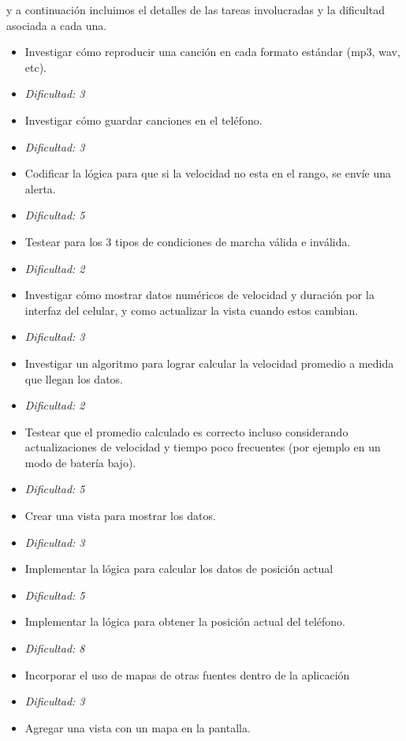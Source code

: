 \documentclass[10pt, a4paper,english,spanish]{article}
\begin{document}
y a continuaci\'on incluimos el detalles de las tareas involucradas y la dificultad asociada a cada una.

\begin{itemize}
	\itemsep 0em
	\item Investigar cómo reproducir una canción en cada formato estándar (mp3,
	wav, etc).
	\item[] \hfill \textit{Dificultad: 3}
	\item Investigar cómo guardar canciones en el teléfono.
	\item[] \hfill \textit{Dificultad: 3}
	\item Codificar la lógica para que si la velocidad no esta en el rango, se
	envíe una alerta.
	\item[] \hfill \textit{Dificultad: 5}
	\item Testear para los 3 tipos de condiciones de marcha válida e inválida.
	\item[] \hfill \textit{Dificultad: 2}
	\item Investigar cómo mostrar datos numéricos de velocidad y duración por la interfaz del celular, y como actualizar
	la vista cuando estos cambian.
	\item[] \hfill \textit{Dificultad: 3}
	\item Investigar un algoritmo para lograr calcular la velocidad promedio a medida que llegan los datos.
	\item[] \hfill \textit{Dificultad: 2}
	\item Testear que el promedio calculado es correcto incluso considerando actualizaciones de velocidad y tiempo poco frecuentes 
		(por ejemplo en un modo de batería bajo).
	\item[] \hfill \textit{Dificultad: 5}
	\item Crear una vista para mostrar los datos.
	\item[] \hfill \textit{Dificultad: 3}
	\item Implementar la lógica para calcular los datos de posición actual
	\item[] \hfill \textit{Dificultad: 5}
	\item Implementar la lógica para obtener la posición actual del teléfono.
	\item[] \hfill \textit{Dificultad: 8}
	\item Incorporar el uso de mapas de otras fuentes dentro de la aplicación
	\item[] \hfill \textit{Dificultad: 3}
	\item Agregar una vista con un mapa en la pantalla.

\end{itemize}
\end{document}
